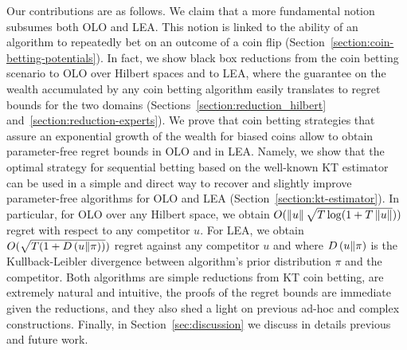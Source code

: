 Our contributions are as follows. We claim that a more fundamental notion
subsumes both \ac{OLO} and \ac{LEA}. This notion is linked to the ability of an
algorithm to repeatedly bet on an outcome of a coin flip
(Section~\ref{section:coin-betting-potentials}). In fact, we show black box
reductions from the coin betting scenario to \ac{OLO} over Hilbert spaces and to
\ac{LEA}, where the guarantee on the wealth accumulated by any coin betting
algorithm easily translates to regret bounds for the two domains
(Sections~\ref{section:reduction_hilbert} and~\ref{section:reduction-experts}).
We prove that coin betting strategies that assure an exponential growth of the
wealth for biased coins allow to obtain parameter-free regret bounds in \ac{OLO}
and in \ac{LEA}. Namely, we show that the optimal strategy for sequential
betting based on the well-known \ac{KT} estimator~\citep{KrichevskyT81} can be
used in a simple and direct way to recover and slightly improve parameter-free
algorithms for \ac{OLO} and \ac{LEA} (Section~\ref{section:kt-estimator}). In
particular, for \ac{OLO} over any Hilbert space, we obtain $O(\left\|{u}\right\|\sqrt{T
\log(1+T \left\|{u}\right\|}))$ regret with respect to any competitor $u$. For \ac{LEA},
we obtain $O(\sqrt{T (1 + D\left({u}\middle\|{\pi}\right))})$ regret against any competitor $u$ and
where $D\left({u}\middle\|{\pi}\right)$ is the Kullback-Leibler divergence between algorithm's prior
distribution $\pi$ and the competitor. Both algorithms are simple reductions
from \ac{KT} coin betting, are extremely natural and intuitive, the proofs of
the regret bounds are immediate given the reductions, and they also shed a light
on previous ad-hoc and complex constructions. Finally, in
Section~\ref{sec:discussion} we discuss in details previous and future work.


